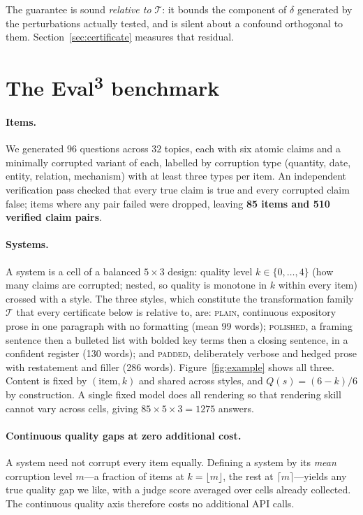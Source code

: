 \documentclass{article}
\theoremstyle{plain}
\theoremstyle{definition}
\begin{document}
The guarantee is sound \emph{relative to} $\mathcal{T}$: it bounds the component of $\delta$
generated by the perturbations actually tested, and is silent about a confound orthogonal to
them. Section~\ref{sec:certificate} measures that residual.

\section{The Eval\textsuperscript{3} benchmark}
\label{sec:benchmark}

\paragraph{Items.} We generated $96$ questions across $32$ topics, each with six atomic claims
and a minimally corrupted variant of each, labelled by corruption type (quantity, date, entity,
relation, mechanism) with at least three types per item. An independent verification pass
checked that every true claim is true and every corrupted claim false; items where any pair
failed were dropped, leaving \textbf{85 items and 510 verified claim pairs}.

\paragraph{Systems.} A system is a cell of a balanced $5\times3$ design: quality level
$k\in\{0,\dots,4\}$ (how many claims are corrupted; nested, so quality is monotone in $k$ within
every item) crossed with a style. The three styles, which constitute the transformation family
$\mathcal{T}$ that every certificate below is relative to, are: \textsc{plain}, continuous
expository prose in one paragraph with no formatting (mean 99 words); \textsc{polished}, a
framing sentence then a bulleted list with bolded key terms then a closing sentence, in a
confident register (130 words); and \textsc{padded}, deliberately verbose and hedged prose with
restatement and filler (286 words). Figure~\ref{fig:example} shows all three. Content is fixed by
$(\text{item},k)$ and shared across styles, and $Q(s)=(6-k)/6$ by construction. A single fixed
model does all rendering so that rendering skill cannot vary across cells, giving
$85\times5\times3=1275$ answers.

\paragraph{Continuous quality gaps at zero additional cost.} A system need not corrupt every
item equally. Defining a system by its \emph{mean} corruption level $m$---a fraction of items
at $k=\lfloor m\rfloor$, the rest at $\lceil m\rceil$---yields any true quality gap we like,
with a judge score averaged over cells already collected. The continuous quality axis therefore
costs no additional API calls.
\end{document}
